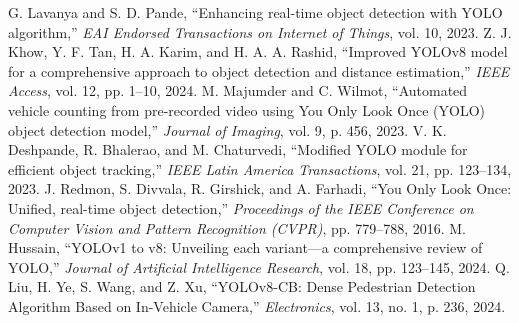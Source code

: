 \begin{thebibliography}{00}
%
%
 G. Lavanya and S. D. Pande, ``Enhancing real-time object detection with YOLO algorithm,'' \textit{EAI Endorsed Transactions on Internet of Things}, vol. 10, 2023.
%
 Z. J. Khow, Y. F. Tan, H. A. Karim, and H. A. A. Rashid, ``Improved YOLOv8 model for a comprehensive approach to object detection and distance estimation,'' \textit{IEEE Access}, vol. 12, pp. 1--10, 2024.
%
 M. Majumder and C. Wilmot, ``Automated vehicle counting from pre-recorded video using You Only Look Once (YOLO) object detection model,'' \textit{Journal of Imaging}, vol. 9, p. 456, 2023.
%
 V. K. Deshpande, R. Bhalerao, and M. Chaturvedi, ``Modified YOLO module for efficient object tracking,'' \textit{IEEE Latin America Transactions}, vol. 21, pp. 123--134, 2023.
%
 J. Redmon, S. Divvala, R. Girshick, and A. Farhadi, ``You Only Look Once: Unified, real-time object detection,'' \textit{Proceedings of the IEEE Conference on Computer Vision and Pattern Recognition (CVPR)}, pp. 779--788, 2016.
%
 M. Hussain, ``YOLOv1 to v8: Unveiling each variant—a comprehensive review of YOLO,'' \textit{Journal of Artificial Intelligence Research}, vol. 18, pp. 123--145, 2024.
%
 Q. Liu, H. Ye, S. Wang, and Z. Xu, “YOLOv8-CB: Dense Pedestrian Detection Algorithm Based on In-Vehicle Camera,” \textit{Electronics}, vol. 13, no. 1, p. 236, 2024.
%
%
\end{thebibliography}
%
%
%